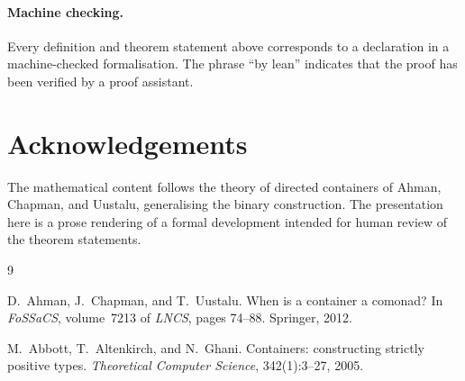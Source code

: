 \documentclass[11pt,a4paper]{article}
\theoremstyle{plain}
\theoremstyle{definition}
\begin{document}
\paragraph{Machine checking.}
Every definition and theorem statement above corresponds to a declaration
in a machine-checked formalisation. The phrase ``by lean'' indicates that
the proof has been verified by a proof assistant.

\section*{Acknowledgements}

The mathematical content follows the theory of directed containers of
Ahman, Chapman, and Uustalu, generalising the binary construction. The
presentation here is a prose rendering of a formal development intended
for human review of the theorem statements.

\begin{thebibliography}{9}

D.~Ahman, J.~Chapman, and T.~Uustalu.
\newblock When is a container a comonad?
\newblock In \emph{FoSSaCS}, volume~7213 of \emph{LNCS}, pages 74--88.
\newblock Springer, 2012.

M.~Abbott, T.~Altenkirch, and N.~Ghani.
\newblock Containers: constructing strictly positive types.
\newblock \emph{Theoretical Computer Science}, 342(1):3--27, 2005.

\end{thebibliography}
\end{document}
